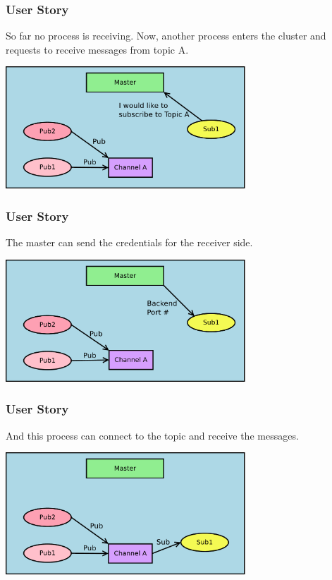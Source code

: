 \documentclass[xcolor=svgnames]{beamer}
\begin{document}
\begin{frame}[fragile]
  \frametitle{User Story}
 So far no process is receiving.  Now, another process enters the cluster and
 requests to receive messages from topic A.
\begin{center}
\includegraphics[width=9cm]{./Diagram8.pdf}
\end{center}
\end{frame}


\begin{frame}[fragile]
  \frametitle{User Story}
  The master can send the credentials for the receiver side.
\begin{center}
\includegraphics[width=9cm]{./Diagram9.pdf}
\end{center}
\end{frame}


\begin{frame}[fragile]
  \frametitle{User Story}
  And this process can connect to the topic and receive the messages.
\begin{center}
\includegraphics[width=9cm]{./Diagram10.pdf}
\end{center}
\end{frame}
\end{document}
